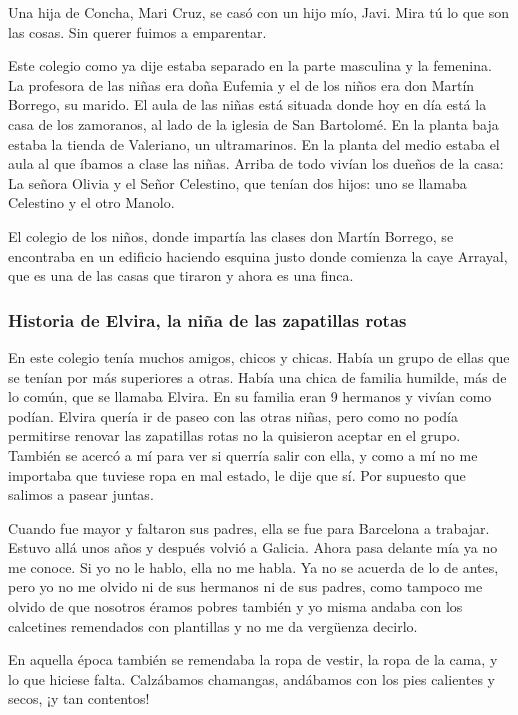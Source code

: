 \documentclass[12pt,a5paper]{book}
\begin{document}
Una hija de Concha, Mari Cruz, se casó con un hijo mío, Javi. Mira tú lo que son las cosas. Sin querer fuimos a emparentar.

Este colegio como ya dije estaba separado en la parte masculina y la femenina. La profesora de las niñas era doña Eufemia y el de los niños era don Martín Borrego, su marido. El aula de las niñas está situada donde hoy en día está la casa de los zamoranos, al lado de la iglesia de San Bartolomé. En la planta baja estaba la tienda de Valeriano, un ultramarinos. En la planta del medio estaba el aula al que íbamos a clase las niñas. Arriba de todo vivían los dueños de la casa: La señora Olivia y el Señor Celestino, que tenían dos hijos: uno se llamaba Celestino y el otro Manolo.

El colegio de los niños, donde impartía las clases don Martín Borrego, se encontraba en un edificio haciendo esquina justo donde comienza la caye Arrayal, que es una de las casas que tiraron y ahora es una finca.


\subsubsection*{Historia de Elvira, la niña de las zapatillas rotas}

En este colegio tenía muchos amigos, chicos y chicas. Había un grupo de ellas que se tenían por más superiores a otras. Había una chica de familia humilde, más de lo común, que se llamaba Elvira. En su familia eran 9 hermanos y vivían como podían. Elvira  quería ir de paseo con las otras niñas, pero como no podía permitirse renovar las zapatillas rotas no la quisieron aceptar en el grupo. También se acercó a mí para ver si querría salir con ella, y como a mí no me importaba que tuviese ropa en mal estado, le dije que sí. Por supuesto que salimos a pasear juntas.

Cuando fue mayor y faltaron sus padres, ella se fue para Barcelona a trabajar. Estuvo allá unos años y después volvió a Galicia. Ahora pasa delante mía ya no me conoce. Si yo no le hablo, ella no me habla. Ya no se acuerda de lo de antes, pero yo no me olvido ni de sus hermanos ni de sus padres, como tampoco me olvido de que nosotros éramos pobres también y yo misma andaba con los calcetines remendados con plantillas y no me da vergüenza decirlo.

En aquella época también se remendaba la ropa de vestir, la ropa de la cama, y lo que hiciese falta. Calzábamos chamangas, andábamos con los pies calientes y secos, ¡y tan contentos!
\end{document}
